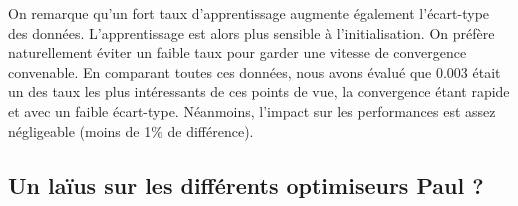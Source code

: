On remarque qu'un fort taux d'apprentissage augmente également l'écart-type des données. L'apprentissage est alors plus sensible à l'initialisation. On préfère
naturellement éviter un faible taux pour garder une vitesse de convergence convenable. En comparant toutes ces données, nous avons évalué que 0.003 était un des taux 
les plus intéressants de ces points de vue, la convergence étant rapide et avec un faible écart-type. Néanmoins, l'impact sur les performances est assez négligeable
(moins de 1\% de différence).


\subsection{Un laïus sur les différents optimiseurs Paul ?}

















